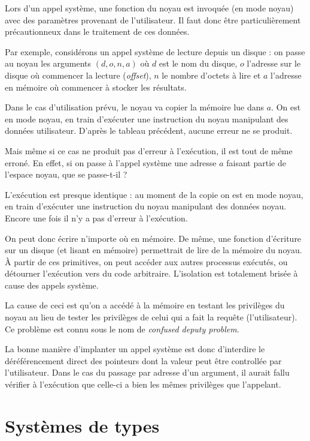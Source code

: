 Lors d'un appel système, une fonction du noyau est invoquée (en mode noyau) avec
des paramètres provenant de l'utilisateur. Il faut donc être particulièrement
précautionneux dans le traitement de ces données.

Par exemple, considérons un appel système de lecture depuis un disque : on passe
au noyau les arguments $(d, o, n, a)$ où $d$ est le nom du disque, $o$ l'adresse
sur le disque où commencer la lecture (\emph{offset}), $n$ le nombre d'octets à
lire et $a$ l'adresse en mémoire où commencer à stocker les résultats.

Dans le cas d'utilisation prévu, le noyau va copier la mémoire lue dans $a$. On
est en mode noyau, en train d'exécuter une instruction du noyau manipulant des
données utilisateur. D'après le tableau précédent, %
aucune erreur ne se produit.

Mais même si ce cas ne produit pas d'erreur à l'exécution, il est tout de même
erroné. En effet, si on passe à l'appel système une adresse $a$ faisant partie
de l'espace noyau, que se passe-t-il ?

L'exécution est presque identique : au moment de la copie on est en mode noyau,
en train d'exécuter une instruction du noyau manipulant des données noyau.
Encore une fois il n'y a pas d'erreur à l'exécution.

On peut donc écrire n'importe où en mémoire. De même, une fonction d'écriture
sur un disque (et lisant en mémoire) permettrait de lire de la mémoire du noyau.
À partir de ces primitives, on peut accéder aux autres processus exécutés, ou
détourner l'exécution vers du code arbitraire. L'isolation est totalement
brisée à cause des appels système.

La cause de ceci est qu'on a accédé à la mémoire en testant les privilèges du
noyau au lieu de tester les privilèges de celui qui a fait la requête
(l'utilisateur). Ce problème est connu sous le nom de \emph{confused deputy
problem}\cite{hardy88confused}.

La bonne manière d'implanter un appel système est donc d'interdire le
déréférencement direct des pointeurs dont la valeur peut être controllée par
l'utilisateur. Dans le cas du passage par adresse d'un argument, il aurait fallu
vérifier à l'exécution que celle-ci a bien les mêmes privilèges que l'appelant.

\section{Systèmes de types}

